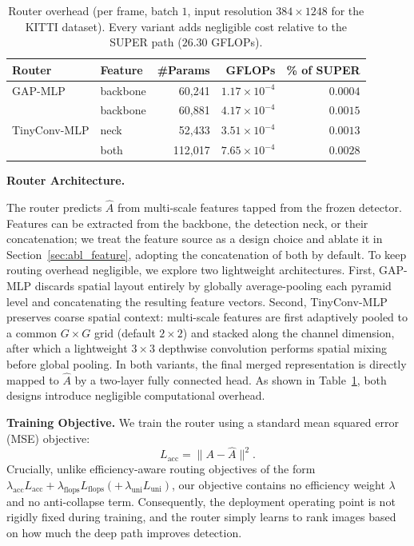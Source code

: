 \begin{table}[t]
\caption{
    Router overhead (per frame, batch $1$, input resolution $384\times1248$ for the KITTI dataset). 
    Every variant adds negligible cost relative to the SUPER path ($26.30$ GFLOPs). 
}
\label{tab:overhead}
\centering
\begin{tabular}{llrrr}
\toprule
Router & Feature & \#Params & GFLOPs & \% of SUPER\\
\midrule
GAP-MLP & backbone & 60{,}241 & $1.17\times10^{-4}$ & $0.0004$\\
\midrule
\multirow{3}{*}{TinyConv-MLP} 
 & backbone & 60{,}881 & $4.17\times10^{-4}$ & $0.0015$\\
 & neck & 52{,}433 & $3.51\times10^{-4}$ & $0.0013$\\
 & both & 112{,}017 & $7.65\times10^{-4}$ & $0.0028$\\
\bottomrule
\end{tabular}
\end{table}

\medskip
\noindent\textbf{Router Architecture.}

The router predicts $\hat{A}$ from multi-scale features tapped from the frozen detector. 
Features can be extracted from the backbone, the detection neck, or their concatenation; we treat the feature source as a design choice and ablate it in Section~\ref{sec:abl_feature}, adopting the concatenation of both by default.
To keep routing overhead negligible, we explore two lightweight architectures. 
First, GAP-MLP discards spatial layout entirely by globally average-pooling each pyramid level and concatenating the resulting feature vectors. 
Second, TinyConv-MLP preserves coarse spatial context: multi-scale features are first adaptively pooled to a common $G\times G$ grid (default $2\times2$) and stacked along the channel dimension, after which a lightweight $3\times3$ depthwise convolution performs spatial mixing before global pooling. 
In both variants, the final merged representation is directly mapped to $\hat{A}$ by a two-layer fully connected head. 
As shown in Table~\ref{tab:overhead}, both designs introduce negligible computational overhead.



\medskip
\noindent\textbf{Training Objective.}
We train the router using a standard mean squared error (MSE) objective:
\begin{equation}
L_{\text{acc}} = \| A - \hat{A} \|^2.
\label{eq:loss}
\end{equation}
Crucially, unlike efficiency-aware routing objectives of the form
$\lambda_{\text{acc}}L_{\text{acc}} + \lambda_{\text{flops}}L_{\text{flops}}
(+\,\lambda_{\text{uni}}L_{\text{uni}})$, our objective contains no efficiency
weight $\lambda$ and no anti-collapse term. 
Consequently, the deployment operating point is not rigidly fixed during training, and the router simply learns to rank images based on how much the deep path improves detection.


